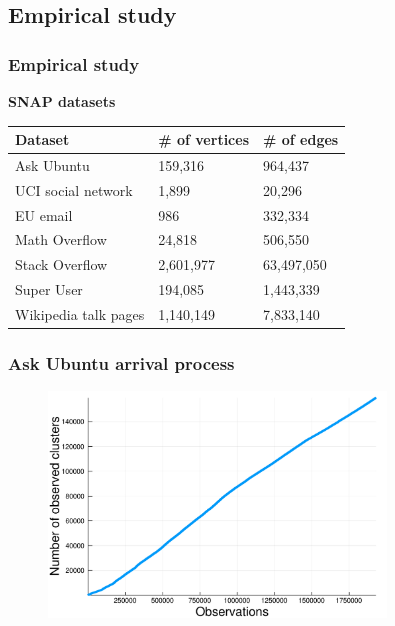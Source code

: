\documentclass[final,hyperref={pdfpagelabels=false},noamsthm]{beamer}
\begin{document}
\subsection{Empirical study}
\begin{frame}
	\frametitle{Empirical study}
	\textbf{SNAP datasets} \cite{snapnets}
	\begin{table}[b]
		\label{tab:datasets}
		\begin{center}
			\begin{tabular}{lll}
				Dataset                 & \# of vertices   & \# of edges    \\
				\hline
				Ask Ubuntu    & 159,316   & 964,437    \\
				UCI social network   & 1,899     & 20,296     \\
				EU email        & 986       & 332,334    \\
				Math Overflow & 24,818    & 506,550    \\
				Stack Overflow           & 2,601,977 & 63,497,050 \\
				Super User    & 194,085   & 1,443,339  \\
				Wikipedia talk pages    & 1,140,149 & 7,833,140 \\
			\end{tabular}
		\end{center}
	\end{table}
	
\end{frame}

\begin{frame}
	\frametitle{Ask Ubuntu arrival process}
	\begin{figure}[h]
		\includegraphics[width=0.8\textwidth]{fig/arrival_times_askubuntu.pdf}
	\end{figure}
	
\end{frame}
\end{document}
